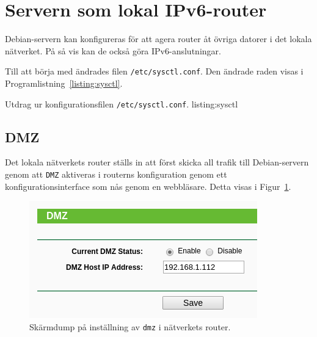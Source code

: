 %
%
%


\section{Servern som lokal IPv6-router}
Debian-servern kan konfigureras för att agera router åt övriga datorer i det
lokala nätverket. På så vis kan de också göra IPv6-anslutningar.

Till att börja med ändrades filen \texttt{/etc/sysctl.conf}. Den ändrade
raden visas i Programlistning~\ref{listing:sysctl}.

             {Utdrag ur konfigurationsfilen \texttt{/etc/sysctl.conf}.}
             {listing:sysctl}

\subsection{DMZ}
Det lokala nätverkets router ställs in att först skicka all trafik till
Debian-servern genom att \texttt{DMZ} aktiveras i routerns konfiguration genom
ett konfigurationsinterface som nås genom en webbläsare.
Detta visas i Figur~\ref{fig:dmz}.

\begin{figure}[H]
  \centering
  \includegraphics[width=0.5\linewidth]{include/dmz}
  \caption[Skärmdump på inställning av \texttt{dmz}]
          {Skärmdump på inställning av \texttt{dmz} i nätverkets router.}
  \label{fig:dmz}
\end{figure}


